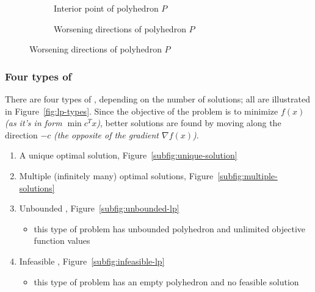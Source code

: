 \documentclass[english]{article}
\begin{document}
\begin{figure}[htbp]
  \bigskip
  \centering
  \begin{subfigure}[b]{0.495\textwidth}
    \bigskip
    \centering
    \caption{Interior point of polyhedron \(P\)}
    \label{subfig:interior-point-solution}
    \bigskip
  \end{subfigure}
  \begin{subfigure}[b]{0.495\textwidth}
    \bigskip
    \centering
    \caption{Worsening directions of polyhedron \(P\)}
    \label{subfig:worsening-point-direction}
    \bigskip
  \end{subfigure}
  \bigskip
\end{figure}

\subsubsection{Four types of \LP}

There are four types of \LP, depending on the number of solutions; all are illustrated in Figure~\ref{fig:lp-types}.
Since the objective of the problem is to minimize \(f(x)\) \textit{(as it's in form \(\min c^T x\))}, better solutions are found by moving along the direction \(-c\) \textit{(the opposite of the gradient \(\nabla f(x)\))}.

\begin{enumerate}
  \item A unique optimal solution, Figure~\ref{subfig:unique-solution}
  \item Multiple (infinitely many) optimal solutions, Figure~\ref{subfig:multiple-solutions}
  \item Unbounded \LP, Figure~\ref{subfig:unbounded-lp}
        \begin{itemize}
          \item this type of problem has unbounded polyhedron and unlimited objective function values
        \end{itemize}
  \item Infeasible \LP, Figure~\ref{subfig:infeasible-lp}
        \begin{itemize}
          \item this type of problem has an empty polyhedron and no feasible solution
        \end{itemize}
\end{enumerate}
\end{document}

